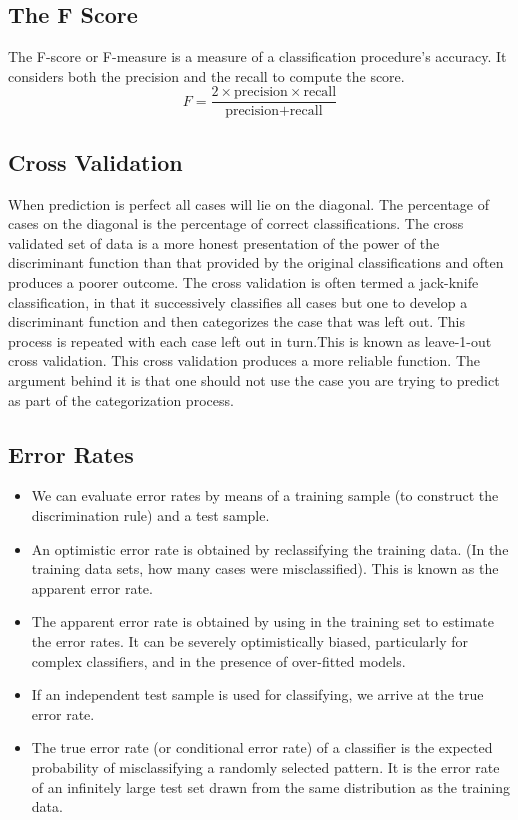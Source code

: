 \documentclass[]{report}
\begin{document}
\subsection*{The F Score}
The F-score or F-measure is a measure of a classification procedure’s accuracy.
It considers both the precision and the recall to compute the score.
\[ F = \frac{2 \times \mbox{precision} \times \mbox{recall}}{\mbox{precision} + \mbox{recall}}\]


\subsection*{ Cross Validation}
When prediction
is perfect all cases will lie on the diagonal. The percentage of cases on the
diagonal is the percentage of correct classifications. The cross validated set of
data is a more honest presentation of the power of the discriminant function
than that provided by the original classifications and often produces a poorer
outcome. The cross validation is often termed a jack-knife classification, in
that it successively classifies all cases but one to develop a discriminant
function and then categorizes the case that was left out. This process is
repeated with each case left out in turn.This is known as leave-1-out cross
validation.
This cross validation produces a more reliable function. The argument
behind it is that one should not use the case you are trying to predict as part
of the categorization process.
\subsection*{Error Rates}
\begin{itemize}
	\item We can evaluate error rates by means of a training sample (to construct the
	discrimination rule) and a test sample.
	\item An optimistic error rate is obtained by reclassifying the training data. (In
	the training data sets, how many cases were misclassified). This is known
	as the apparent error rate.
	\item The apparent error rate is obtained by using in the training set to estimate
	the error rates. It can be severely optimistically biased, particularly for
	complex classifiers, and in the presence of over-fitted models.
	\item If an independent test sample is used for classifying, we arrive at the true
	error rate.
	\item The true error rate (or conditional error rate) of a classifier is the
	expected probability of misclassifying a randomly selected pattern. It is the
	error rate of an infinitely large test set drawn from the same distribution as
	the training data.
\end{itemize}
\end{document}
